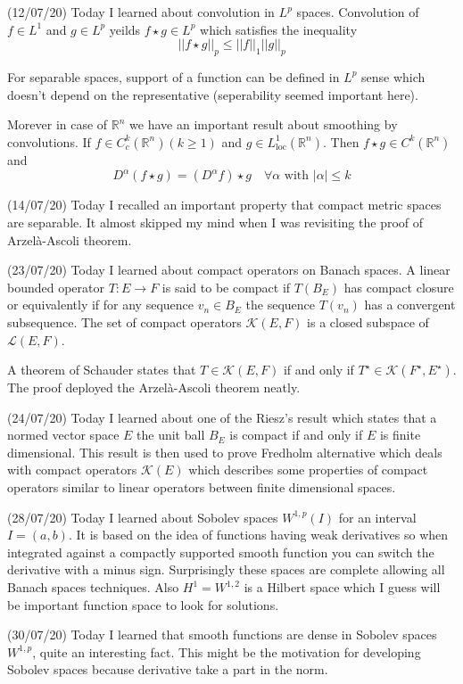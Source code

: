 \documentclass[12pt,a4paper]{article}
\newcommand{\R}{\mathbb{R}}
\begin{document}
(12/07/20) Today I learned about convolution in $L^p$ spaces. Convolution of  $f \in L^1$ and $g \in L^p$ yeilds $f \star g \in L^p$ which satisfies the inequality
\[ ||f \star g ||_p \le ||f||_1 ||g||_p \]  

For separable spaces, support of a function can be defined in $L^p$ sense which doesn't depend on the representative (seperability seemed important here).

Morever in case of $\R^n$ we have an important result about smoothing by convolutions.
 If $f\in C^k_c(\R^n)(k \ge 1)$ and $g \in L^1_{\text{loc}}(\R^n)$. Then $ f \star g \in C^k(\R^n)$ and 
 \[ D^\alpha(f \star g ) = (D^\alpha f )\star g \quad \forall \alpha \text{ with } |\alpha| 
 \le k \]

(14/07/20) Today I recalled an important property that compact metric spaces are separable. It almost skipped my mind when I was revisiting the proof of Arzel\`{a}-Ascoli theorem. 

(23/07/20) Today I learned about compact operators on Banach spaces. A linear bounded operator $T: E \to F$ is said to be compact if $T(B_E)$ has compact closure or equivalently if for any sequence $v_n \in B_E$ the sequence $T(v_n)$ has a convergent subsequence. The set of compact operators $\mathcal{K}(E,F)$ is a closed subspace  of $\mathcal{L}(E,F)$.

A theorem of Schauder states that $T \in \mathcal{K}(E,F)$ if and only if $T^\star \in \mathcal{K}(F^\star,E^\star)$. The proof deployed the Arzel\`{a}-Ascoli theorem neatly.

 
(24/07/20) Today I learned about one of the Riesz's result which states that a normed vector space $E$ the unit ball $B_E$ is compact if and only if $E$ is finite dimensional. This result is then used to prove Fredholm alternative which deals with compact operators $\mathcal{K}(E)$ which describes some properties of compact operators similar to linear operators between finite dimensional spaces.

(28/07/20) Today I learned about Sobolev spaces $W^{1,p}(I)$ for an interval $I = (a,b)$. It is based on the idea of functions having weak derivatives so when integrated against a compactly supported smooth function you can switch the derivative with a minus sign. Surprisingly these spaces are complete allowing all Banach spaces techniques. Also $H^1=W^{1,2}$ is a Hilbert space which I guess will be important function space to look for solutions. 

(30/07/20) Today I learned that smooth functions are dense in Sobolev spaces $W^{1,p}$, quite an interesting fact. This might be the motivation for developing Sobolev spaces because derivative take a part in the norm. 
\end{document}
